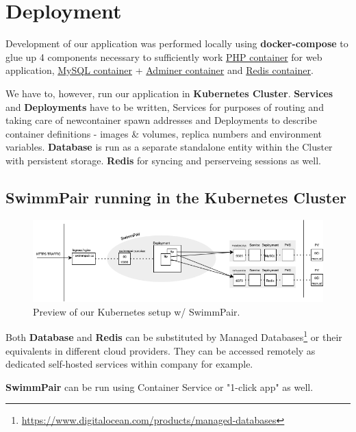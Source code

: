 \chapter{Deployment}
Development of our application was performed locally using \textbf{docker-compose} to glue up 4 components necessary to sufficiently work \underline{PHP container} for web application, \underline{MySQL container} + \underline{Adminer container} and \underline{Redis container}.
\par
We have to, however, run our application in \textbf{Kubernetes Cluster}. \textbf{Services} and \textbf{Deployments} have to be written, Services for purposes of routing and taking care of newcontainer spawn addresses and Deployments to describe container definitions - images \& volumes, replica numbers and environment variables. \textbf{Database} is run as a separate standalone entity within the Cluster with persistent storage. \textbf{Redis} for syncing and perserveing sessions as well.
\newline
\par
\section*{SwimmPair running in the Kubernetes Cluster}
\par
\begin{figure}[h]
    \centering	
    \includegraphics[scale=0.52]{img/swimmpair_deployment_k8s.png}
    \caption{Preview of our Kubernetes setup w/ SwimmPair.}
    \label{fig5.1:deplk8s}
\end{figure}
Both \textbf{Database} and \textbf{Redis} can be substituted by Managed Databases\footnote{\url{https://www.digitalocean.com/products/managed-databases}} or their equivalents in different cloud providers. They can be accessed remotely as dedicated self-hosted services within company for example.
\par \textbf{SwimmPair} can be run using Container Service or "1-click app" as well. 
